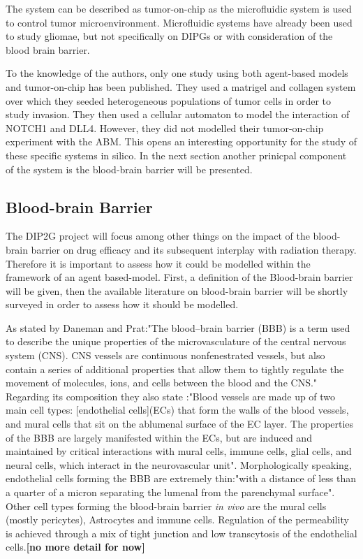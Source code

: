 \documentclass[11pt,a4paper]{article}
\begin{document}
The system can be described as tumor-on-chip as the microfluidic system is used to control tumor microenvironment. Microfluidic systems have already been used to study gliomae, but not specifically on DIPGs or with consideration of the blood brain barrier.\cite{Liu2021} 

To the knowledge of the authors, only one study using both agent-based models and tumor-on-chip has been published.\cite{Torab2021} They used a matrigel and collagen system over which they seeded heterogeneous populations of tumor cells in order to study invasion. They then used a cellular automaton to model the interaction of NOTCH1 and DLL4. However, they did not modelled their tumor-on-chip experiment with the ABM. This opens an interesting opportunity for the study of these specific systems in silico. In the next section another prinicpal component of the system is the blood-brain barrier will be presented.


\subsection{Blood-brain Barrier}
The DIP2G project will focus among other things on the impact of the blood-brain barrier on drug efficacy and its subsequent interplay with radiation therapy. Therefore it is important to assess how it could be modelled within the framework of an agent based-model. First, a definition of the Blood-brain barrier will be given, then the available literature on blood-brain barrier will be shortly surveyed in order to assess how it should be modelled.

As stated by Daneman and Prat:"The blood–brain barrier (BBB) is a term used to describe the unique properties of the microvasculature of the central nervous system (CNS). CNS vessels are continuous nonfenestrated vessels, but also contain a series of additional properties that allow them to tightly regulate the movement of molecules, ions, and cells between the blood and the CNS."\cite{Daneman2015} Regarding its composition they also state :"Blood vessels are made up of two main cell types: [endothelial cells](ECs) that form the walls of the blood vessels, and mural cells that sit on the ablumenal surface of the EC layer. The properties of the BBB are largely manifested within the ECs, but are induced and maintained by critical interactions with mural cells, immune cells, glial cells, and neural cells, which interact in the neurovascular unit". Morphologically speaking, endothelial cells forming the BBB are extremely thin:"with a distance of less than a quarter of a micron separating the lumenal from the parenchymal surface". Other cell types forming the blood-brain barrier \textit{in vivo} are the mural cells (mostly pericytes), Astrocytes and immune cells. Regulation of the permeability is achieved through a mix of tight junction and low transcytosis of the endothelial cells.\textbf{[no more detail for now]}
\end{document}
